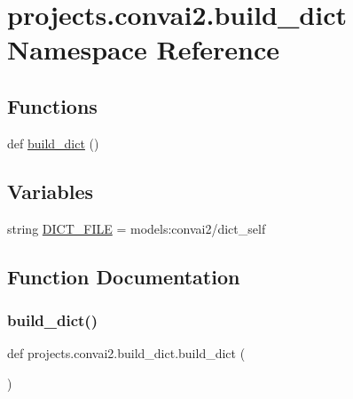 \hypertarget{namespaceprojects_1_1convai2_1_1build__dict}{}\section{projects.\+convai2.\+build\+\_\+dict Namespace Reference}
\label{namespaceprojects_1_1convai2_1_1build__dict}
\subsection*{Functions}
\begin{DoxyCompactItemize}
\item 
def \hyperlink{namespaceprojects_1_1convai2_1_1build__dict_a0e5fa5d8d2bd2bc934e287a49d2d60c7}{build\+\_\+dict} ()
\end{DoxyCompactItemize}
\subsection*{Variables}
\begin{DoxyCompactItemize}
\item 
string \hyperlink{namespaceprojects_1_1convai2_1_1build__dict_a1151af8881623ff215716da1739f2a85}{D\+I\+C\+T\+\_\+\+F\+I\+LE} = \textquotesingle{}models\+:convai2/dict\+\_\+self\textquotesingle{}
\end{DoxyCompactItemize}


\subsection{Function Documentation}
\mbox{\label{namespaceprojects_1_1convai2_1_1build__dict_a0e5fa5d8d2bd2bc934e287a49d2d60c7}} 
\subsubsection{\texorpdfstring{build\+\_\+dict()}{build\_dict()}}
{\footnotesize\ttfamily def projects.\+convai2.\+build\+\_\+dict.\+build\+\_\+dict (\begin{DoxyParamCaption}{ }\end{DoxyParamCaption})}



